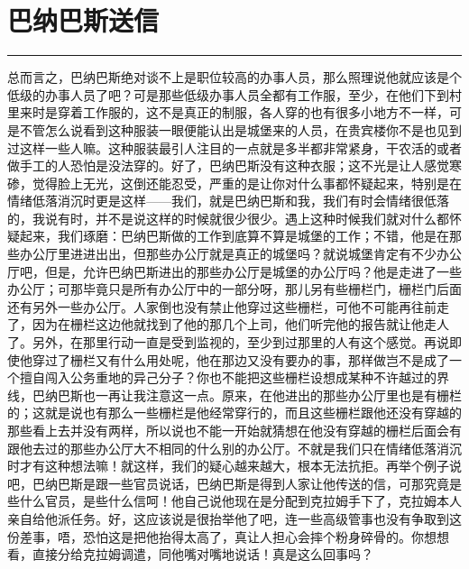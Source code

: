 \documentclass[12pt,a4paper]{article}
\begin{document}
\section{巴纳巴斯送信}
\vspace{0.5em}
\vspace{0.3em}

\noindent\rule{\textwidth}{0.4pt}

\vspace{0.3em}



总而言之，巴纳巴斯绝对谈不上是职位较高的办事人员，那么照理说他就应该是个低级的办事人员了吧？可是那些低级办事人员全都有工作服，至少，在他们下到村里来时是穿着工作服的，这不是真正的制服，各人穿的也有很多小地方不一样，可是不管怎么说看到这种服装一眼便能认出是城堡来的人员，在贵宾楼你不是也见到过这样一些人嘛。这种服装最引人注目的一点就是多半都非常紧身，干农活的或者做手工的人恐怕是没法穿的。好了，巴纳巴斯没有这种衣服；这不光是让人感觉寒碜，觉得脸上无光，这倒还能忍受，严重的是让你对什么事都怀疑起来，特别是在情绪低落消沉时更是这样——我们，就是巴纳巴斯和我，我们有时会情绪很低落的，我说有时，并不是说这样的时候就很少很少。遇上这种时候我们就对什么都怀疑起来，我们琢磨：巴纳巴斯做的工作到底算不算是城堡的工作；不错，他是在那些办公厅里进进出出，但那些办公厅就是真正的城堡吗？就说城堡肯定有不少办公厅吧，但是，允许巴纳巴斯进出的那些办公厅是城堡的办公厅吗？他是走进了一些办公厅；可那毕竟只是所有办公厅中的一部分呀，那儿另有些栅栏门，栅栏门后面还有另外一些办公厅。人家倒也没有禁止他穿过这些栅栏，可他不可能再往前走了，因为在栅栏这边他就找到了他的那几个上司，他们听完他的报告就让他走人了。另外，在那里行动一直是受到监视的，至少到过那里的人有这个感觉。再说即使他穿过了栅栏又有什么用处呢，他在那边又没有要办的事，那样做岂不是成了一个擅自闯入公务重地的异己分子？你也不能把这些栅栏设想成某种不许越过的界线，巴纳巴斯也一再让我注意这一点。原来，在他进出的那些办公厅里也是有栅栏的；这就是说也有那么一些栅栏是他经常穿行的，而且这些栅栏跟他还没有穿越的那些看上去并没有两样，所以说也不能一开始就猜想在他没有穿越的栅栏后面会有跟他去过的那些办公厅大不相同的什么别的办公厅。不就是我们只在情绪低落消沉时才有这种想法嘛！就这样，我们的疑心越来越大，根本无法抗拒。再举个例子说吧，巴纳巴斯是跟一些官员说话，巴纳巴斯是得到人家让他传送的信，可那究竟是些什么官员，是些什么信呵！他自己说他现在是分配到克拉姆手下了，克拉姆本人亲自给他派任务。好，这应该说是很抬举他了吧，连一些高级管事也没有争取到这份差事，唔，恐怕这是把他抬得太高了，真让人担心会摔个粉身碎骨的。你想想看，直接分给克拉姆调遣，同他嘴对嘴地说话！真是这么回事吗？
\end{document}
